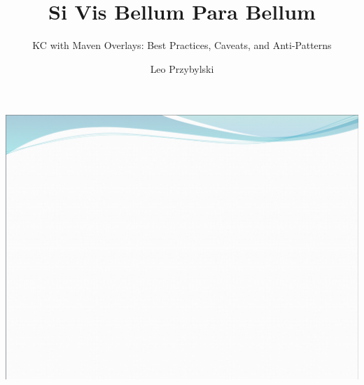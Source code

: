 \documentclass[xcolor=dvipsnames,14pt,professionalfonts]{beamer}
\begin{document}
\title{Si Vis Bellum Para Bellum}
\subtitle{KC with Maven Overlays: Best Practices, Caveats, and  Anti-Patterns}
\author[Leo]{Leo Przybylski}

\usebackgroundtemplate%
{%
    \includegraphics[width=\paperwidth,height=\paperheight]{images/header.png}%
}

{
%
\begin{frame}[plain]
  \titlepage
\end{frame}
}
\end{document}
